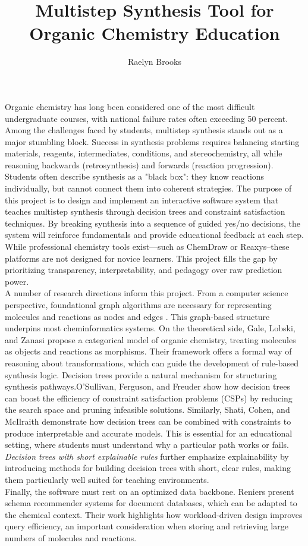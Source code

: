 \documentclass[12pt]{article}
\title{\textbf{Multistep Synthesis Tool for Organic Chemistry Education}}
\author{Raelyn Brooks}
\begin{document}
\maketitle
 
\indent 
Organic chemistry has long been considered one of the most difficult undergraduate courses, with national failure rates often exceeding 50 percent. 
Among the challenges faced by students, multistep synthesis stands out as a major stumbling block. Success in synthesis problems requires balancing starting materials, reagents, intermediates, conditions, and stereochemistry, all while reasoning backwards (retrosynthesis) and forwards (reaction progression). 
Students often describe synthesis as a "black box": they know reactions individually, but cannot connect them into coherent strategies.
The purpose of this project is to design and implement an interactive software system that teaches multistep synthesis through decision trees and constraint satisfaction techniques. By breaking synthesis into a sequence of guided yes/no decisions, the system will reinforce fundamentals and provide educational feedback at each step. 
While professional chemistry tools exist—such as ChemDraw or Reaxys--these platforms are not designed for novice learners. This project fills the gap by prioritizing transparency, interpretability, and pedagogy over raw prediction power.
\\
\indent 
A number of research directions inform this project. From a computer science perspective, foundational graph algorithms are necessary for representing molecules and reactions as nodes and edges \cite{clrsAlgorithms}. 
This graph-based structure underpins most cheminformatics systems. On the theoretical side, Gale, Lobski, and Zanasi \cite{10.1016/j.tcs.2025.115084} propose a categorical model of organic chemistry, treating molecules as objects and reactions as morphisms. 
Their framework offers a formal way of reasoning about transformations, which can guide the development of rule-based synthesis logic. Decision trees provide a natural mechanism for structuring synthesis pathways.O’Sullivan, Ferguson, and Freuder show how decision trees can boost the efficiency of constraint satisfaction problems (CSPs) by reducing the search space and pruning infeasible solutions. 
\cite{10.1109/ICTAI.2004.38} Similarly, Shati, Cohen, and McIlraith demonstrate how decision trees can be combined with constraints to produce interpretable and accurate models. This is essential for an educational setting, where students must understand why a particular path works or fails. \cite{10.24963/ijcai.2023/225}
\textit{Decision trees with short explainable rules} further emphasize explainability by introducing methods for building decision trees with short, clear rules, making them particularly well suited for teaching environments. \cite{10.1016/j.tcs.2025.115344}
\\
\indent
Finally, the software must rest on an optimized data backbone. Reniers present schema recommender systems for document databases, which can be adapted to the chemical context. Their work highlights how workload-driven design improves query efficiency, an important consideration when storing and retrieving large numbers of molecules and reactions. \cite{10.1007/978-3-030-62522-1_35}
\end{document}
